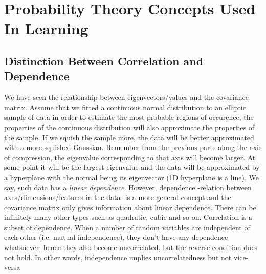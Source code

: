 \documentclass{article}
\numberwithin{equation}{subsection}
\begin{document}
\section{Probability Theory Concepts Used In Learning}
\subsection{Distinction Between Correlation and Dependence}
\label{cor_dep}
We have seen the relationship between eigenvectors/values and the covariance matrix. Assume that we fitted a continuous normal distribution to an elliptic
sample of data in order to estimate the most probable regions of occurence, the properties of the continuous distribution will also approximate the properties of the sample. If we squish the sample more, the data will be better approximated with a more squished Gaussian. Remember from the previous parts along the axis of compression, the eigenvalue corresponding to that axis will become larger. At some point it will be the largest eigenvalue and the data will be approximated by a hyperplane with the normal being its eigenvector (1D hyperplane is a line). We say, such data has a \textit{linear dependence}. However, dependence -relation between axes/dimensions/features in the data- is a more general concept and the covariance matrix only gives information about linear dependence. There can be infinitely many other types such as quadratic, cubic and so on. Correlation is a subset of dependence. When a number of random variables are independent of each other (i.e. mutual independence), they don't have any dependence whatsoever; hence they also become uncorrelated, but the reverse condition does not hold. In other words, independence implies uncorrelatedness but not vice-versa
\end{document}
